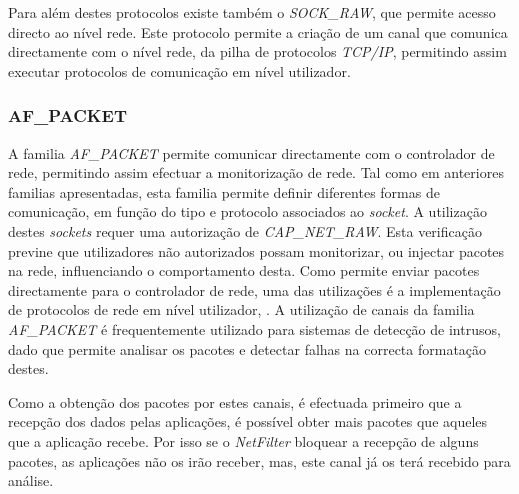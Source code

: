 Para além destes protocolos existe também o \textit{SOCK\_RAW}, que permite acesso directo ao nível rede.
Este protocolo permite a criação de um canal que comunica directamente com o nível rede, da pilha de protocolos \textit{TCP/IP}, permitindo assim executar protocolos de comunicação em nível utilizador.

\subsubsection{AF\_PACKET}
\label{subsub:af_packet}

A familia \textit{AF\_PACKET} permite comunicar directamente com o controlador de rede, permitindo assim efectuar a monitorização de rede.
Tal como em anteriores familias apresentadas, esta familia permite definir diferentes formas de comunicação, em função do tipo e protocolo associados ao \textit{socket}.
A utilização destes \textit{sockets} requer uma autorização de \textit{CAP\_NET\_RAW}.
Esta verificação previne que utilizadores não autorizados possam monitorizar, ou injectar pacotes na rede, influenciando o comportamento desta.
Como permite enviar pacotes directamente para o controlador de rede, uma das utilizações é a implementação de protocolos de rede em nível utilizador, .
A utilização de canais da familia \textit{AF\_PACKET} é frequentemente utilizado para sistemas de detecção de intrusos, dado que permite analisar os pacotes e detectar falhas na correcta formatação destes.

Como a obtenção dos pacotes por estes canais, é efectuada primeiro que a recepção dos dados pelas aplicações, é possível obter mais pacotes que aqueles que a aplicação recebe.
Por isso se o \textit{NetFilter} bloquear a recepção de alguns pacotes, as aplicações não os irão receber, mas, este canal já os terá recebido para análise.
 
 

